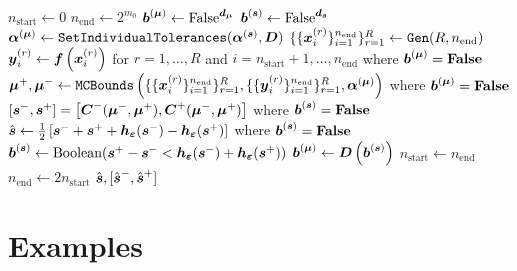 \documentclass{article}[12pt]
\begin{document}
\begin{algorithm}[h!]
\begin{algorithmic}
    \State $n_\text{start} \gets 0$
    \State $n_\text{end} \gets 2^{m_0}$
    \State $\boldsymbol{b}^{(\boldsymbol{\mu})} \gets \text{False}^{\boldsymbol{d}_{\boldsymbol{\mu}}}$
    \State $\boldsymbol{b}^{(\boldsymbol{s})} \gets \text{False}^{\boldsymbol{d}_{\boldsymbol{s}}}$
    \State $\boldsymbol{\alpha}^{(\boldsymbol{\mu})} \gets \texttt{SetIndividualTolerances}(\boldsymbol{\alpha}^{(\boldsymbol{s})},\boldsymbol{D})$ 
        \State $\{\{\boldsymbol{x}_i^{(r)}\}_{i=1}^{n_\text{end}}\}_{r=1}^R \gets \texttt{Gen}(R,n_\text{end})$ \\ 
        \State $\boldsymbol{y}_i^{(r)} \gets \boldsymbol{f}\left(\boldsymbol{x}_i^{(r)}\right)$ for $r=1,\dots,R$ and $i=n_\text{start}+1,\dots,n_\text{end}$ where $\boldsymbol{b}^{(\boldsymbol{\mu})}=\textbf{\text{False}}$ \\ 
        \State $\boldsymbol{\mu}^+,\boldsymbol{\mu}^- \gets \texttt{MCBounds}\left(\{\{\boldsymbol{x}_i^{(r)}\}_{i=1}^{n_\text{end}}\}_{r=1}^R, \{\{\boldsymbol{y}_i^{(r)}\}_{i=1}^{n_\text{end}}\}_{r=1}^R,\boldsymbol{\alpha}^{(\boldsymbol{\mu})}\right)$ where $\boldsymbol{b}^{(\boldsymbol{\mu})}=\textbf{\text{False}}$ \\ 
        \State $[\boldsymbol{s}^-,\boldsymbol{s}^+] = \left[\boldsymbol{C}^-(\boldsymbol{\mu}^-,\boldsymbol{\mu}^+),\boldsymbol{C}^+(\boldsymbol{\mu}^-,\boldsymbol{\mu}^+)\right]$ where $\boldsymbol{b}^{(\boldsymbol{s})} = \textbf{\text{False}}$
        \State $\hat{\boldsymbol{s}} \gets \frac{1}{2}\left[\boldsymbol{s}^-+\boldsymbol{s}^++\boldsymbol{h}_{\boldsymbol{\varepsilon}}(\boldsymbol{s}^-)-\boldsymbol{h}_{\boldsymbol{\varepsilon}}(\boldsymbol{s}^+)\right]$ where $\boldsymbol{b}^{(\boldsymbol{s})} = \textbf{\text{False}}$
        \State $\boldsymbol{b}^{(\boldsymbol{s})} \gets \text{Boolean}(\boldsymbol{s}^+-\boldsymbol{s}^- < \boldsymbol{h}_{\boldsymbol{\varepsilon}}(\boldsymbol{s}^-)+\boldsymbol{h}_{\boldsymbol{\varepsilon}}(\boldsymbol{s}^+))$
        \State $\boldsymbol{b}^{(\boldsymbol{\mu})} \gets \boldsymbol{D}\left(\boldsymbol{b}^{(\boldsymbol{s})}\right)$
        \State $n_\text{start} \gets n_\text{end}$
        \State $n_\text{end} \gets 2n_\text{start}$
    \EndWhile
    \State \Return $\hat{\boldsymbol{s}},[\hat{\boldsymbol{s}}^-,\hat{\boldsymbol{s}}^+]$
    \end{algorithmic}
\end{algorithm}

\section{Examples} \label{sec:examples}
\end{document}

